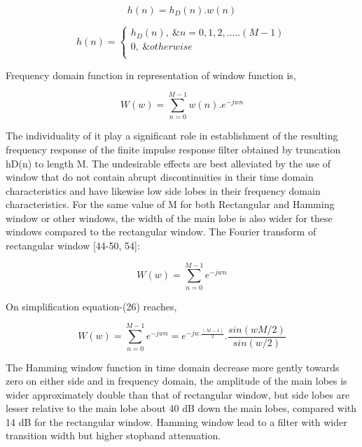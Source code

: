 \begin{equation}\tag{15}
h \left( n \right) =h_{D} \left( n \right) .w \left( n \right)
\end{equation}

\begin{equation}\tag{16}
h \left( n \right) = \left\{ \begin{array}{ll}
	h_{D} \left( n \right) ,~ \&n=0,1,2, \ldots .. \left( M-1 \right) \\
	0,~ \&otherwise\\
	\end{array}
\end{equation}
\begin{justify}
Frequency domain function in representation of window function is,
\end{justify}\par


\begin{equation}\tag{17}
W \left( w \right) = \sum _{n=0}^{M-1}w \left( n \right) .e^{-jwn}
\end{equation}
\begin{justify}
The individuality of it play a significant role in establishment of the resulting frequency response of the finite impulse response filter obtained by truncation hD(n) to length M. The undesirable effects are best alleviated by the use of window that do not contain abrupt discontinuities in their time domain characteristics and have likewise low side lobes in their frequency domain characteristics. For the same value of M for both Rectangular and Hamming window or other windows, the width of the main lobe is also wider for these windows compared to the rectangular window. The Fourier transform of rectangular window [44-50, 54]:
\end{justify}\par


\begin{equation}\tag{18}
W \left( w \right) = \sum _{n=0}^{M-1}e^{-jwn}
\end{equation}
\begin{justify}
On simplification equation-(26) reaches,
\end{justify}\par


\begin{equation}\tag{19}
W \left( w \right) = \sum _{n=0}^{M-1}e^{-jwn}=e^{-jw.\frac{ \left( M-1 \right) }{2}}.\frac{sin \left( wM/2 \right) }{sin \left( w/2 \right) }
\end{equation}
\begin{justify}
The Hamming window function in time domain decrease more gently towards zero on either side and in frequency domain, the amplitude of the main lobes is wider approximately double than that of rectangular window, but side lobes are lesser relative to the main lobe about 40 dB down the main lobes, compared with 14 dB for the rectangular window. Hamming window lead to a filter with wider transition width but higher stopband attenuation.
\end{justify}\par


